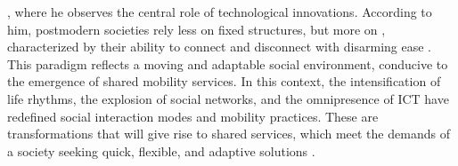 \begin{refsegment}
{}, where he observes the central role of technological innovations. According to him, postmodern societies rely less on fixed structures, but more on , characterized by their ability to connect and disconnect with disarming ease \textcolor{blue}{\autocite{philosophie_science_et_societe_modernite_2017}}. This paradigm reflects a moving and adaptable social environment, conducive to the emergence of shared mobility services. In this context, the intensification of life rhythms, the explosion of social networks, and the omnipresence of \acrshort{ICT} have redefined social interaction modes and mobility practices. These are transformations that will give rise to shared services, which meet the demands of a society seeking quick, flexible, and adaptive solutions \textcolor{blue}{\autocite[44]{mathew_analysis_2019}}.%


\end{refsegment}
